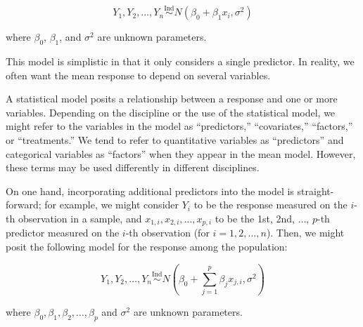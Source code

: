 \documentclass[
  letterpaper,
  DIV=11,
  numbers=noendperiod]{scrreprt}
\theoremstyle{definition}
\theoremstyle{plain}
\theoremstyle{definition}
\theoremstyle{remark}
\begin{document}
\[Y_1, Y_2, \dotsc, Y_n \stackrel{\text{Ind}}{\sim} N\left(\beta_0 + \beta_1 x_i, \sigma^2\right)\]

where \(\beta_0\), \(\beta_1\), and \(\sigma^2\) are unknown parameters.

This model is simplistic in that it only considers a single predictor.
In reality, we often want the mean response to depend on several
variables.

\begin{tcolorbox}[enhanced jigsaw, breakable, colframe=quarto-callout-note-color-frame, titlerule=0mm, arc=.35mm, coltitle=black, opacitybacktitle=0.6, leftrule=.75mm, opacityback=0, left=2mm, toprule=.15mm, colbacktitle=quarto-callout-note-color!10!white, title=\textcolor{quarto-callout-note-color}{\faInfo}\hspace{0.5em}{Predictors vs.~Covariates}, bottomtitle=1mm, toptitle=1mm, rightrule=.15mm, bottomrule=.15mm, colback=white]

A statistical model posits a relationship between a response and one or
more variables. Depending on the discipline or the use of the
statistical model, we might refer to the variables in the model as
``predictors,'' ``covariates,'' ``factors,'' or ``treatments.'' We tend
to refer to quantitative variables as ``predictors'' and categorical
variables as ``factors'' when they appear in the mean model. However,
these terms may be used differently in different disciplines.

\end{tcolorbox}

On one hand, incorporating additional predictors into the model is
straight-forward; for example, we might consider \(Y_i\) to be the
response measured on the \(i\)-th observation in a sample, and
\(x_{1,i}, x_{2, i}, \dotsc, x_{p,i}\) to be the 1st, 2nd, \(\dotsc\),
\(p\)-th predictor measured on the \(i\)-th observation (for
\(i = 1, 2, \dotsc, n\)). Then, we might posit the following model for
the response among the population:

\[Y_1, Y_2, \dotsc, Y_n \stackrel{\text{Ind}}{\sim} N\left(\beta_0 + \sum_{j=1}^{p} \beta_j x_{j,i}, \sigma^2\right)\]

where \(\beta_0, \beta_1, \beta_2, \dotsc, \beta_p\) and \(\sigma^2\)
are unknown parameters.
\end{document}
